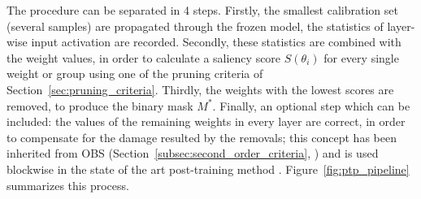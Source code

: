 The procedure can be separated in 4 steps. Firstly, the smallest calibration set (several samples) are propagated through the frozen model, the statistics of layer-wise input activation are recorded. Secondly, these statistics are combined with the weight values, in order to calculate a saliency score $S(\theta_i)$ for every single weight or group using one of the pruning criteria of Section~\ref{sec:pruning_criteria}. Thirdly, the weights with the lowest scores are removed, to produce the binary mask $M^*$. Finally, an optional step which can be included: the values of the remaining weights in every layer are correct, in order to compensate for the damage resulted by the removals; this concept has been inherited from OBS (Section~\ref{subsec:second_order_criteria}, \cite{hassibi1993second}) and is used blockwise in the state of the art post-training method \cite{frantar2023sparsegpt}. Figure~\ref{fig:ptp_pipeline} summarizes this process.

